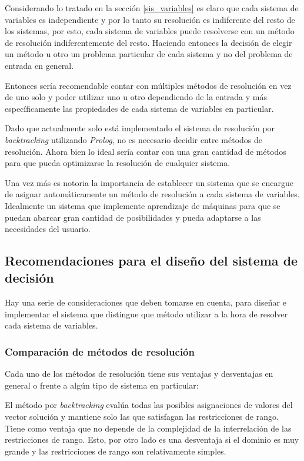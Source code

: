 Considerando lo tratado en la sección \ref{sis_variables} es claro que cada sistema de
variables es independiente y por lo tanto su resolución es indiferente del
resto de los sistemas, por esto, cada sistema de variables puede resolverse con
un método de resolución indiferentemente del resto. Haciendo entonces
la decisión de elegir un método u otro un problema particular de cada
sistema y no del problema de entrada en general.

Entonces sería recomendable contar con múltiples métodos de resolución
en vez de uno solo y poder utilizar uno u otro dependiendo de la entrada
y más específicamente las propiedades de cada sistema de variables en
particular.

Dado que actualmente solo está implementado el sistema de resolución por
\emph{backtracking} utilizando \emph{Prolog}, no es necesario decidir entre métodos de 
resolución. Ahora bien lo ideal sería contar con una gran cantidad de métodos
para que pueda optimizarse la resolución de cualquier sistema.

Una vez más es notoria la importancia de establecer un sistema que se
encargue de asignar automáticamente un método de resolución a cada sistema 
de variables. Idealmente un sistema que implemente aprendizaje de máquinas
para que se puedan abarcar gran cantidad de posibilidades y pueda adaptarse a
las necesidades del usuario.

\subsection{Recomendaciones para el diseño del sistema de decisión} 
Hay una serie de consideraciones que deben tomarse en cuenta, para diseñar e implementar
el sistema que distingue que método utilizar a la hora de resolver cada 
sistema de variables.

\subsubsection{Comparación de métodos de resolución}
Cada uno de los métodos de resolución tiene sus ventajas y desventajas
en general o frente a algún tipo de sistema en particular:

El método por \emph{backtracking} evalúa todas las posibles asignaciones de valores
del vector solución y mantiene solo las que satisfagan las restricciones de
rango. Tiene como ventaja que no depende de la complejidad de la
interrelación de las restricciones de rango. Esto, por otro lado es una desventaja si el dominio es muy grande
y las restricciones de rango son relativamente simples.

